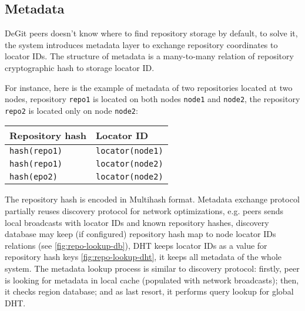 \documentclass[nonacm=true]{acmart}
\newcommand{\code}[1]{\texttt{#1}}
\begin{document}
\subsection{Metadata}
\label{sec:metadata}

DeGit peers doesn't know where to find repository storage by default,
to solve it, the system introduces metadata layer to exchange repository coordinates
to locator IDs. The structure of metadata is a many-to-many relation of
repository cryptographic hash to storage locator ID.

For instance, here is the example of metadata of two repositories located at two nodes,
repository \code{repo1} is located on both nodes \code{node1} and \code{node2},
the repository \code{repo2} is located only on node \code{node2}:

\begin{tabular}{l | l}
  Repository hash & Locator ID \\ \hline
  \code{hash(repo1)} & \code{locator(node1)} \\
  \code{hash(repo1)} & \code{locator(node2)} \\
  \code{hash(epo2)} & \code{locator(node2)} \\
\end{tabular}

The repository hash is encoded in Multihash format. Metadata exchange protocol partially reuses
discovery protocol for network optimizations, e.g. peers sends local broadcasts
with locator IDs and known repository hashes, discovery database may keep (if configured)
repository hash map to node locator IDs relations (see \ref{fig:repo-lookup-db}),
DHT keeps locator IDs as a value for repository hash keys \ref{fig:repo-lookup-dht},
it keeps all metadata of the whole system. The metadata lookup process is similar to discovery protocol:
firstly, peer is looking for metadata in local cache (populated with network broadcasts); then, it checks
region database; and as last resort, it performs query lookup for global DHT.
\end{document}
